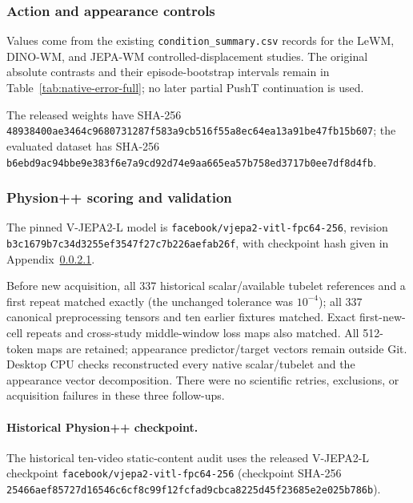 \subsubsection{Action and appearance controls}
Values come from the existing \texttt{condition\_summary.csv} records for the LeWM, DINO-WM, and JEPA-WM controlled-displacement studies. The original absolute contrasts and their episode-bootstrap intervals remain in Table~\ref{tab:native-error-full}; no later partial PushT continuation is used.

The released weights have SHA-256 \texttt{48938400ae3464c9\allowbreak 680731287f583a9c\allowbreak b516f55a8ec64ea1\allowbreak 3a91be47fb15b607}; the evaluated dataset has SHA-256 \texttt{b6ebd9ac94bbe9e3\allowbreak 83f6e7a9cd92d74e\allowbreak 9aa665ea57b758ed\allowbreak 3717b0ee7df8d4fb}.

\subsubsection{Physion++ scoring and validation}
The pinned V-JEPA2-L model is \texttt{facebook/vjepa2-vitl-fpc64-256}, revision \texttt{b3c1679b7c34d3255ef3547f27c7b226aefab26f}, with checkpoint hash given in Appendix~\ref{app:physion-checkpoint-provenance}.

Before new acquisition, all 337 historical scalar/available tubelet references and a first repeat matched exactly (the unchanged tolerance was $10^{-4}$); all 337 canonical preprocessing tensors and ten earlier fixtures matched. Exact first-new-cell repeats and cross-study middle-window loss maps also matched. All 512-token maps are retained; appearance predictor/target vectors remain outside Git. Desktop CPU checks reconstructed every native scalar/tubelet and the appearance vector decomposition. There were no scientific retries, exclusions, or acquisition failures in these three follow-ups.

\paragraph{Historical Physion++ checkpoint.}
\label{app:physion-checkpoint-provenance}
The historical ten-video static-content audit uses the released V-JEPA2-L checkpoint \texttt{facebook/vjepa2-vitl-fpc64-256} (checkpoint SHA-256 \texttt{25466aef85727d16\allowbreak 546c6cf8c99f12fc\allowbreak fad9cbca8225d45f\allowbreak 23685e2e025b786b}).

